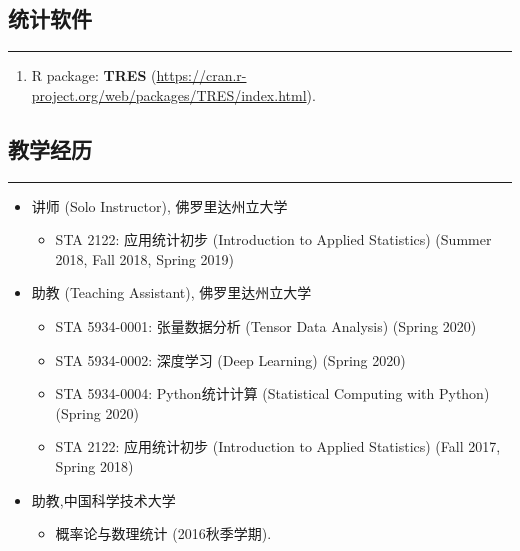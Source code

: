 \documentclass[10pt, oneside]{article}
\begin{document}
\subsection*{统计软件}
\noindent\rule{\textwidth}{1pt}
\begin{enumerate}[itemsep=0pt]
    \item R package: \textbf{TRES} (\url{https://cran.r-project.org/web/packages/TRES/index.html}).
\end{enumerate}

\subsection*{教学经历}
\noindent\rule{\textwidth}{1pt}
\vspace{-6mm}
\begin{itemize}[itemsep=-1pt]
    \item 讲师 (Solo Instructor), 佛罗里达州立大学
    \begin{itemize}[topsep=-2pt,itemsep=-1pt]
        \item STA 2122: 应用统计初步 (Introduction to Applied Statistics) (Summer 2018, Fall 2018, Spring 2019)
    \end{itemize}
    \item 助教 (Teaching Assistant), 佛罗里达州立大学
    \begin{itemize}[topsep=-2pt,itemsep=-1pt]
        \item STA 5934-0001: 张量数据分析 (Tensor Data Analysis) (Spring 2020)
        \item STA 5934-0002: 深度学习 (Deep Learning) (Spring 2020)
        \item STA 5934-0004: Python统计计算 (Statistical Computing with Python) (Spring 2020)
        \item STA 2122: 应用统计初步 (Introduction to Applied Statistics) (Fall 2017, Spring 2018)
    \end{itemize}
    \item 助教,中国科学技术大学 
    \begin{itemize}[topsep=-2pt,itemsep=-1pt]
        \item 概率论与数理统计 (2016秋季学期).
    \end{itemize}
\end{itemize}
\end{document}
